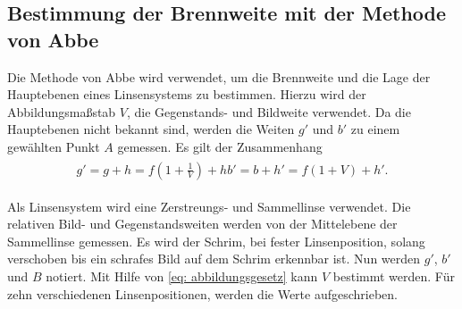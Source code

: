 \subsection{Bestimmung der Brennweite mit der Methode von Abbe}
Die Methode von Abbe wird verwendet, um die Brennweite und die Lage der Hauptebenen
eines Linsensystems zu bestimmen. Hierzu wird der Abbildungsmaßstab $V$,
die Gegenstands- und Bildweite verwendet. Da die Hauptebenen nicht bekannt sind,
werden die Weiten $g'$ und $b'$ zu einem gewählten Punkt $A$ gemessen. Es gilt der Zusammenhang
\begin{align}
  \label{eq: abstaende_abbe}
  \begin{aligned}
    g'=g+h=f\left(1+\frac{1}{V}\right)+h
    b'=b+h'=f\left(1+V\right)+h'.
  \end{aligned}
\end{align}

Als Linsensystem wird eine Zerstreungs- und Sammellinse verwendet.
Die relativen Bild- und Gegenstandsweiten werden von der Mittelebene
der Sammellinse gemessen.
Es wird der Schrim, bei fester Linsenposition, solang verschoben bis ein schrafes
Bild auf dem Schrim erkennbar ist. Nun werden $g'$, $b'$ und $B$ notiert.
Mit Hilfe von \eqref{eq: abbildungsgesetz} kann $V$ bestimmt werden.
Für zehn verschiedenen Linsenpositionen, werden die Werte aufgeschrieben.
